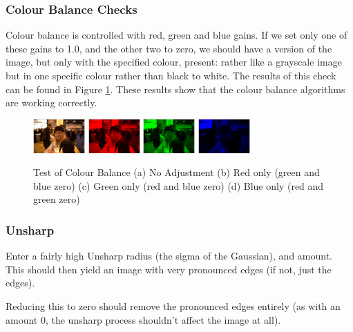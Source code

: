 \documentclass[10pt,a4paper]{article}
\begin{document}

\subsubsection{Colour Balance Checks}
Colour balance is controlled with red, green and blue gains. If we set only one of these gains to 1.0, and the other two to zero, we should
have a version of the image, but only with the specified colour, present: rather like a grayscale image but in one specific colour rather than black to white.
The results of this check can be found in Figure \ref{colourbalancetest}. These results show that the colour balance algorithms are working correctly.
\begin{figure}\label{colourbalancetest}
    \centering
    \subfigure
    {
        \includegraphics[width=75px]{colourtest_no_adjustment}
    }
    \subfigure
    {
        \includegraphics[width=75px]{colourtest_redonly}
    }
    \subfigure
    {
        \includegraphics[width=75px]{colourtest_greenonly}
    }
    \subfigure
    {
        \includegraphics[width=75px]{blueonly}
    }
    \caption{
        Test of Colour Balance 
        (a) No Adjustment
        (b) Red only (green and blue zero)
        (c) Green only (red and blue zero)
        (d) Blue only (red and green zero)
    }
 \end{figure}

\subsubsection{Unsharp}
Enter a fairly high Unsharp radius (the sigma of the Gaussian), and amount. This should then yield an image with very pronounced edges (if not, just the edges).

Reducing this to zero should remove the pronounced edges entirely (as with an amount 0, the unsharp process shouldn't affect the image at all).
\end{document}
